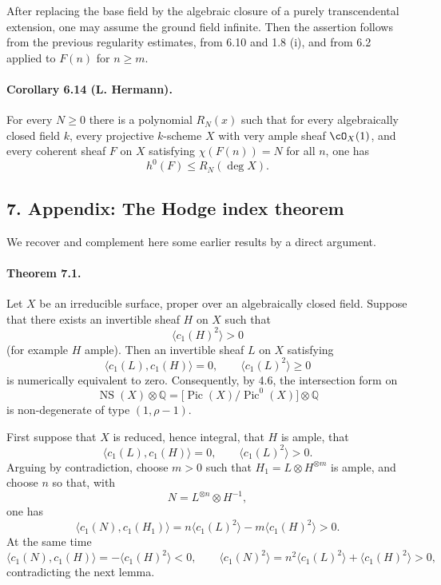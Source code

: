 \documentclass[11pt]{article}
\theoremstyle{plain}
\theoremstyle{definition}
\theoremstyle{remark}
\newcommand{\QQ}{\mathbb Q}
\DeclareMathOperator{\Pic}{Pic}
\providecommand{\NS}{\operatorname{NS}}
\begin{document}
After replacing the base field by the algebraic closure of a purely transcendental extension, one may assume the ground field infinite. Then the assertion follows from the previous regularity estimates, from 6.10 and 1.8 (i), and from 6.2 applied to $F(n)$ for $n\geq m$.

\paragraph{Corollary 6.14 (L. Hermann).}
For every $N\geq 0$ there is a polynomial $R_N(x)$ such that for every algebraically closed field $k$, every projective $k$-scheme $X$ with very ample sheaf $\cO_X(1)$, and every coherent sheaf $F$ on $X$ satisfying $\chi(F(n))=N$ for all $n$, one has
\[
h^0(F)\leq R_N(\deg X).
\]

\subsection*{7. Appendix: The Hodge index theorem}

We recover and complement here some earlier results by a direct argument.

\paragraph{Theorem 7.1.}
Let $X$ be an irreducible surface, proper over an algebraically closed field. Suppose that there exists an invertible sheaf $H$ on $X$ such that
\[
\langle c_1(H)^2\rangle>0
\]
(for example $H$ ample). Then an invertible sheaf $L$ on $X$ satisfying
\[
\langle c_1(L),c_1(H)\rangle=0,\qquad
\langle c_1(L)^2\rangle\geq 0
\]
is numerically equivalent to zero. Consequently, by 4.6, the intersection form on
\[
\NS(X)\otimes\QQ=\bigl[\Pic(X)/\Pic^0(X)\bigr]\otimes\QQ
\]
is non-degenerate of type $(1,\rho-1)$.

First suppose that $X$ is reduced, hence integral, that $H$ is ample, that
\[
\langle c_1(L),c_1(H)\rangle=0,\qquad
\langle c_1(L)^2\rangle>0.
\]
Arguing by contradiction, choose $m>0$ such that $H_1=L\otimes H^{\otimes m}$ is ample, and choose $n$ so that, with
\[
N=L^{\otimes n}\otimes H^{-1},
\]
one has
\[
\langle c_1(N),c_1(H_1)\rangle
 =n\langle c_1(L)^2\rangle-m\langle c_1(H)^2\rangle>0.
\]
At the same time
\[
\langle c_1(N),c_1(H)\rangle=-\langle c_1(H)^2\rangle<0,\qquad
\langle c_1(N)^2\rangle=n^2\langle c_1(L)^2\rangle+\langle c_1(H)^2\rangle>0,
\]
contradicting the next lemma.
\end{document}
